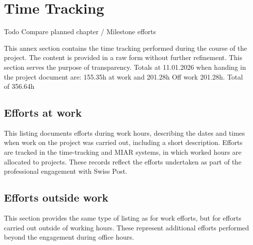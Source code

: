 \clearpage
\chapter{Time Tracking}
\label{AnnexTimeTracking}
Todo
Compare planned chapter / Milestone efforts

This annex section contains the time tracking performed during the course of the project. The content is provided in a raw form without further refinement. This section serves the purpose of transparency. Totals at 11.01.2026 when handing in the project document are: 155.35h at work and 201.28h Off work 201.28h. Total of 356.64h

\section{Efforts at work}
This listing documents efforts during work hours, describing the dates and times when work on the project was carried out, including a short description. Efforts are tracked in the time-tracking and MIAR systems, in which worked hours are allocated to projects. These records reflect the efforts undertaken as part of the professional engagement with Swiss Post.



\section{Efforts outside work}
This section provides the same type of listing as for work efforts, but for efforts carried out outside of working hours. These represent additional efforts performed beyond the engagement during office hours.


